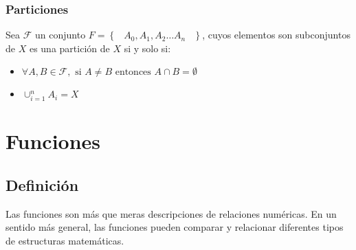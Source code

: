 \documentclass[12pt, fleqn]{report}                             %
\DeclareMathOperator \Space {\quad}                             %
\DeclareMathOperator \MiniSpace {\;}                            %
\newcommand{\Set}[1]{\left\{ \MiniSpace #1 \MiniSpace \right\}} %
\begin{document}
            \clearpage
            \subsection{Particiones}

                Sea $\mathcal{F}$ un conjunto $F = \Set{A_0, A_1, A_2 \dots A_n}$, cuyos elementos
                son subconjuntos de $X$ es una partición de $X$ si y solo si:

                \begin{itemize}
                    \item $\forall A, B \in \mathcal{F}, \text{ si } A \neq B
                        \text{ entonces } A \cap B = \emptyset$

                    \item $\cup_{i = 1}^n A_i = X$
                \end{itemize}













    \chapter{Funciones}
        \clearpage    



        \section{Definición}

            Las funciones son más que meras descripciones de relaciones numéricas. En un sentido más general,
            las funciones pueden comparar y relacionar diferentes tipos de estructuras matemáticas.
\end{document}
